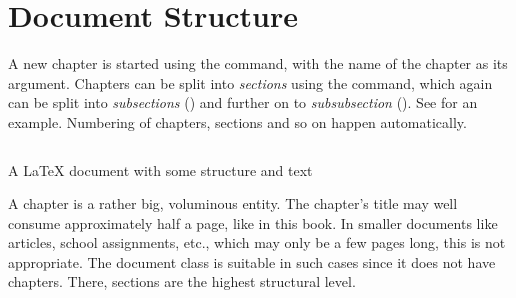 {\section{Document Structure}
\index{\latexin{\chapter}}
\index{\latexin{\section}}
\index{\latexin{\subsection}}
\index{\latexin{\subsubsection}}
A new chapter is started using the \latexin{\chapter} command, with the name of the chapter as its argument. Chapters can be split into \emph{sections} using the \latexin{\section} command, which again can be split into \emph{subsections} (\latexin{\subsection}) and further on to \emph{subsubsection} (\latexin{\subsubsection}). See  for an example. Numbering of chapters, sections and so on happen automatically.

\begin{longlisting}
	\inputminted[frame=lines,linenos]{latex}{latex/structure.tex}
	\caption{A \LaTeX{} document with some structure and text}
	\label{lst:latex:structure}
\end{longlisting}

A chapter is a rather big, voluminous entity. The chapter's title may well consume approximately half a page, like in this book. In smaller documents like articles, school assignments, etc., which may only be a few pages long, this is not appropriate. The   document class is suitable in such cases since it does not have chapters. There, sections are the highest structural level.

}
